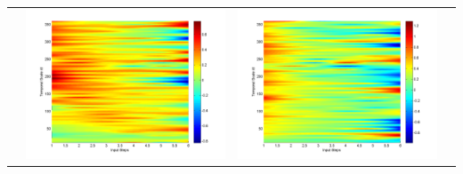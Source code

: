 \documentclass[11pt]{article}
\begin{document}
\begin{table}[H]
{\begin{tabular}{cccc}
&\begin{minipage}{.3\textwidth}\includegraphics[width=\linewidth]{resultgraph/06810000pdiff_former.png}\end{minipage}
&\begin{minipage}{.3\textwidth}\includegraphics[width=\linewidth]{resultgraph/06810000epdiff_former.png}\end{minipage}

\end{tabular}}
\end{table}
\end{document}
